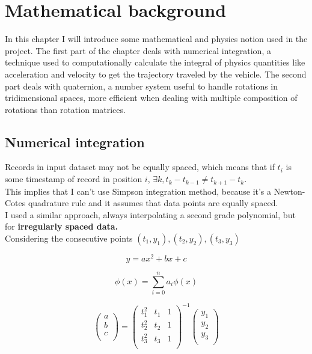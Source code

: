 \chapter{Mathematical background}
\label{chap:math_background}

In this chapter I will introduce some mathematical and physics notion used in the project.
The first part of the chapter deals with numerical integration, a technique used to computationally calculate the integral of physics quantities like acceleration and velocity to get the trajectory traveled by the vehicle.
The second part deals with quaternion, a number system useful to handle rotations in tridimensional spaces, more efficient when dealing with multiple composition of rotations than rotation matrices.
\\
\section{Numerical integration}
Records in input dataset may not be equally spaced, which means that if $t_i$ is some timestamp of record in position $i$, $\exists k, t_{k}-t_{k-1}\neq t_{k+1}-t_k$. \\
This implies that I can't use Simpson integration method, because it's a Newton-Cotes quadrature rule and it assumes that data points are equally spaced.  \\
I used a similar approach, always interpolating a second grade polynomial, but for \textbf{irregularly spaced data.} \cite{integrating-irregularly} \\
Considering the consecutive points $(t_1,y_1),(t_2,y_2),(t_3,y_3)$

$$y=ax^2+bx+c$$

$$ \phi(x) = \sum_{i=0}^n a_i \phi (x)$$ 

$$ 
\begin{pmatrix}
a \\
b \\
c \\
\end{pmatrix}
=
\begin{pmatrix}
t_1^2 & t_1 & 1 \\
t_2^2 & t_2 & 1 \\
t_3^2 & t_3 & 1 \\
\end{pmatrix}^{-1}
\begin{pmatrix}
y_1 \\
y_2 \\
y_3 \\
\end{pmatrix}
$$

